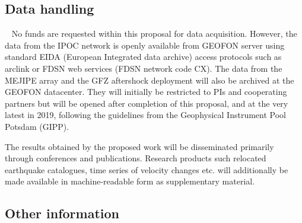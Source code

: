 \documentclass[11pt]{article}
\providecommand{\currfilename}{}
\newcommand{\showfile}{{\bf \tt \color{blue} \currfilename}}
\newcommand{\note}[1]{{\it \color{red} #1}}
\newcommand{\note}[1]{}
\newcommand{\showfile}{}
\begin{document}


\subsection{Data handling}
\showfile
No funds are requested within this proposal for data acquisition.  However, the data from the IPOC network is openly available from GEOFON server using standard EIDA (European Integrated data archive) access protocols such as arclink or FDSN web services (FDSN network code CX). The data from the MEJIPE array and the GFZ aftershock deployment will also be archived at the GEOFON datacenter. They will initially be restricted to PIs and cooperating partners but will be opened after completion of this proposal, and at the very latest in 2019, following the guidelines from the Geophysical Instrument Pool Potsdam (GIPP).

The results obtained by the proposed work will be disseminated primarily through conferences and publications. Research products such relocated earthquake catalogues, time series of velocity changes etc. will additionally be made available in machine-readable form as supplementary material.




\subsection{Other information}
\\
\showfile
\end{document}
